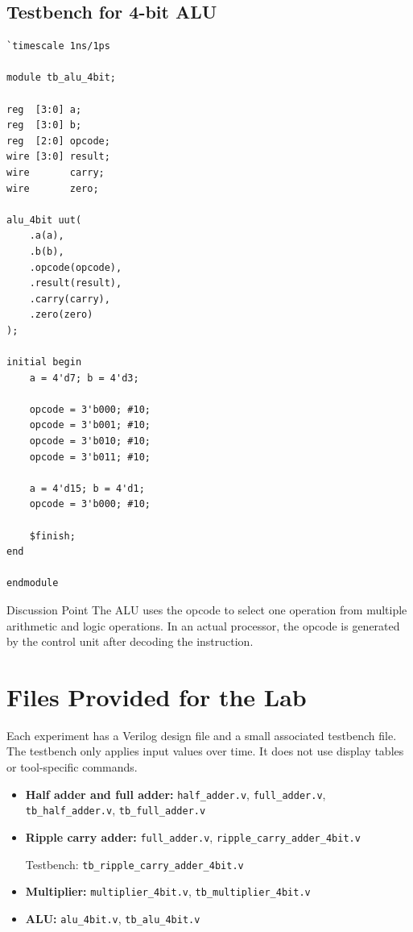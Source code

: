 \documentclass[11pt,a4paper]{article}
\begin{document}
\subsection{Testbench for 4-bit ALU}

\begin{lstlisting}[caption={Testbench for 4-bit ALU}]
`timescale 1ns/1ps

module tb_alu_4bit;

reg  [3:0] a;
reg  [3:0] b;
reg  [2:0] opcode;
wire [3:0] result;
wire       carry;
wire       zero;

alu_4bit uut(
    .a(a),
    .b(b),
    .opcode(opcode),
    .result(result),
    .carry(carry),
    .zero(zero)
);

initial begin
    a = 4'd7; b = 4'd3;

    opcode = 3'b000; #10;
    opcode = 3'b001; #10;
    opcode = 3'b010; #10;
    opcode = 3'b011; #10;

    a = 4'd15; b = 4'd1;
    opcode = 3'b000; #10;

    $finish;
end

endmodule
\end{lstlisting}

\begin{conceptbox}{Discussion Point}
The ALU uses the opcode to select one operation from multiple arithmetic and logic operations. In an actual processor, the opcode is generated by the control unit after decoding the instruction.
\end{conceptbox}

\section{Files Provided for the Lab}

Each experiment has a Verilog design file and a small associated testbench file. The testbench only applies input values over time. It does not use display tables or tool-specific commands.

\begin{itemize}[leftmargin=*]
    \item \textbf{Half adder and full adder:} \texttt{half\_adder.v}, \texttt{full\_adder.v}, \texttt{tb\_half\_adder.v}, \texttt{tb\_full\_adder.v}
    \item \textbf{Ripple carry adder:} \texttt{full\_adder.v}, \texttt{ripple\_carry\_adder\_4bit.v}
    
    Testbench: \texttt{tb\_ripple\_carry\_adder\_4bit.v}
    \item \textbf{Multiplier:} \texttt{multiplier\_4bit.v}, \texttt{tb\_multiplier\_4bit.v}
    \item \textbf{ALU:} \texttt{alu\_4bit.v}, \texttt{tb\_alu\_4bit.v}
\end{itemize}
\end{document}
